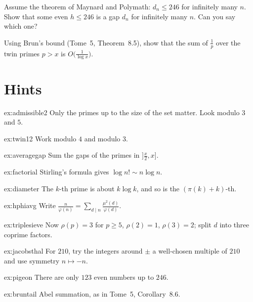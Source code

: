 \begin{exercise}[$\star$]\label{ex:pigeon}
Assume the theorem of Maynard and Polymath: $d_n\le246$ for infinitely many $n$. Show that some even $h\le246$ is a gap $d_n$ for infinitely many $n$.
Can you say which one?
\end{exercise}

\begin{exercise}[$\star\star$]\label{ex:bruntail}
Using Brun's bound (Tome~5, Theorem~8.5), show that the sum of $\frac1p$ over the twin primes $p>x$ is $O\bigl(\frac1{\log x}\bigr)$.
\end{exercise}

\section{Hints}

\begin{hint}{ex:admissible2}
Only the primes up to the size of the set matter. Look modulo $3$ and $5$.
\end{hint}
\begin{hint}{ex:twin12}
Work modulo $4$ and modulo $3$.
\end{hint}
\begin{hint}{ex:averagegap}
Sum the gaps of the primes in $]\frac x2,x]$.
\end{hint}
\begin{hint}{ex:factorial}
Stirling's formula gives $\log n!\sim n\log n$.
\end{hint}
\begin{hint}{ex:diameter}
The $k$-th prime is about $k\log k$, and so is the $(\pi(k)+k)$-th.
\end{hint}
\begin{hint}{ex:hphiavg}
Write $\frac n{\varphi(n)}=\sum_{d\mid n}\frac{\mu^2(d)}{\varphi(d)}$.
\end{hint}
\begin{hint}{ex:triplesieve}
Now $\rho(p)=3$ for $p\ge5$, $\rho(2)=1$, $\rho(3)=2$; split $d$ into three coprime factors.
\end{hint}
\begin{hint}{ex:jacobsthal}
For $210$, try the integers around $\pm$ a well-chosen multiple of $210$ and use symmetry $n\mapsto-n$.
\end{hint}
\begin{hint}{ex:pigeon}
There are only $123$ even numbers up to $246$.
\end{hint}
\begin{hint}{ex:bruntail}
Abel summation, as in Tome~5, Corollary~8.6.
\end{hint}

